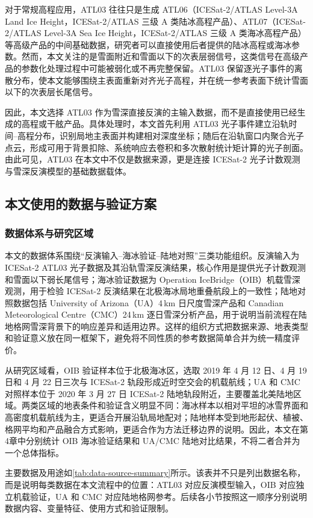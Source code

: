 对于常规高程应用，ATL03 往往只是生成 ATL06（ICESat-2/ATLAS Level-3A Land Ice Height，ICESat-2/ATLAS 三级 A 类陆冰高程产品）、ATL07（ICESat-2/ATLAS Level-3A Sea Ice Height，ICESat-2/ATLAS 三级 A 类海冰高程产品）等高级产品的中间基础数据，研究者可以直接使用后者提供的陆冰高程或海冰参数。然而，本文关注的是雪面附近和雪面以下的次表层弱信号，这类信号在高级产品的参数化处理过程中可能被弱化或不再完整保留。ATL03 保留逐光子事件的离散分布，使本文能够围绕主表面重新对齐光子高程，并在统一参考表面下统计雪面以下的次表层长尾信号。

因此，本文选择 ATL03 作为雪深直接反演的主输入数据，而不是直接使用已经生成的高程或干舷产品。具体处理时，本文首先利用 ATL03 光子事件建立沿轨时间--高程分布，识别局地主表面并构建相对深度坐标；随后在沿轨窗口内聚合光子点云，形成可用于背景扣除、系统响应去卷积和多次散射统计矩计算的光子剖面。由此可见，ATL03 在本文中不仅是数据来源，更是连接 ICESat-2 光子计数观测与雪深反演模型的基础数据载体。

\subsection{本文使用的数据与验证方案}
\subsubsection{数据体系与研究区域}
本文的数据体系围绕``反演输入--海冰验证--陆地对照''三类功能组织。反演输入为 ICESat-2 ATL03 光子数据及其沿轨雪深反演结果，核心作用是提供光子计数观测和雪面以下弱长尾信号；海冰验证数据为 Operation IceBridge（OIB）机载雪深观测，用于检验 ICESat-2 反演结果在北极海冰局地重叠航段上的一致性；陆地对照数据包括 University of Arizona（UA）4\,km 日尺度雪深产品和 Canadian Meteorological Centre（CMC）24\,km 逐日雪深分析产品，用于说明当前流程在陆地格网雪深背景下的响应差异和适用边界。这样的组织方式把数据来源、地表类型和验证意义放在同一框架下，避免将不同性质的参考数据简单合并为统一精度评价。

从研究区域看，OIB 验证样本位于北极海冰区，选取 2019 年 4 月 12 日、4 月 19 日和 4 月 22 日三次与 ICESat-2 轨段形成近时空交会的机载航线；UA 和 CMC 对照样本位于 2020 年 3 月 27 日 ICESat-2 陆地轨段附近，主要覆盖北美陆地区域。两类区域的地表条件和验证含义明显不同：海冰样本以相对平坦的冰雪界面和高密度机载航线为主，更适合开展沿轨局地配对；陆地样本受到地形起伏、植被、格网平均和产品融合方式影响，更适合作为方法迁移边界的说明。因此，本文在第4章中分别统计 OIB 海冰验证结果和 UA/CMC 陆地对比结果，不将二者合并为一个总体指标。

主要数据及用途如\autoref{tab:data-source-summary}所示。该表并不只是列出数据名称，而是说明每类数据在本文流程中的位置：ATL03 对应反演模型输入，OIB 对应独立机载验证，UA 和 CMC 对应陆地格网参考。后续各小节按照这一顺序分别说明数据内容、变量特征、使用方式和验证限制。

